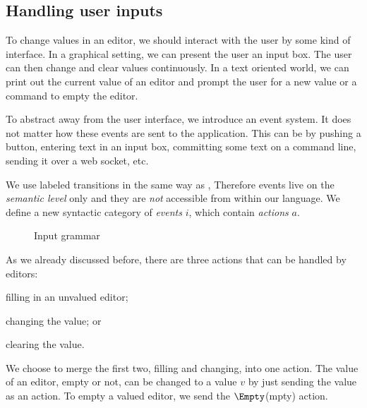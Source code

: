 \subsection{Handling user inputs}
\label{sec:handling}

To change values in an editor,
we should interact with the user by some kind of interface.
In a graphical setting,
we can present the user an input box.
The user can then change and clear values continuously.
In a text oriented world,
we can print out the current value of an editor
and prompt the user for a new value
or a command to empty the editor.

To abstract away from the user interface,
we introduce an event system.
It does not matter how these events are sent to the application.
This can be by pushing a button,
entering text in an input box,
committing some text on a command line,
sending it over a web socket,
etc.

%
We use labeled transitions in the same way as \textcite{school/maktoberdorf/PeytonJones01},
Therefore events live on the \emph{semantic level} only
and they are \emph{not} accessible from within our language.
We define a new syntactic category of \emph{events} $i$,
which contain \emph{actions} $a$.

\begin{figure}[h]
  \small
  \caption{Input grammar} \label{fig:input-grammar}
\end{figure}

As we already discussed before,
there are three actions that can be handled by editors:
\begin{enumerate*}
  \item filling in an unvalued editor;
  \item changing the value; or
  \item clearing the value.
\end{enumerate*}
We choose to merge the first two, filling and changing, into one action.
The value of an editor, empty or not, can be changed to a value $v$ by just sending the value as an action.
To empty a valued editor, we send the $\Empty$(mpty) action.

